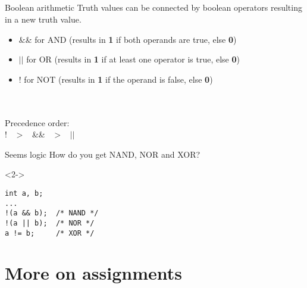 \subsection{}
\begin{frame}{Boolean arithmetic}
	Truth values can be connected by boolean operators resulting in a new truth value.
	\begin{itemize}
		\item \&\& for AND (results in \textbf{1} if both operands are true, else \textbf{0})
		\item $||$ for OR (results in \textbf{1} if at least one operator is true, else \textbf{0})
		\item ! for NOT (results in \textbf{1} if the operand is false, else \textbf{0})
	\end{itemize}
	\ \\\ \\Precedence order:\\
	\centering
	! \ $>$ \ \&\& \ $>$ \ $||$ 
\end{frame}
\begin{frame}[fragile]{Seems logic}
	How do you get NAND, NOR and XOR?
	\begin{uncoverenv}<2->
		\begin{lstlisting}[numbers=none]
int a, b;
...
!(a && b);	/* NAND */
!(a || b);	/* NOR */
a != b;		/* XOR */
\end{lstlisting}
	\end{uncoverenv}
\end{frame}
\section{More on assignments}
